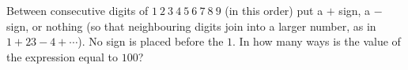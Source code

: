 Between consecutive digits of $1\ 2\ 3\ 4\ 5\ 6\ 7\ 8\ 9$ (in this order) put a $+$ sign, a $-$ sign, or nothing (so that neighbouring digits join into a larger number, as in $1+23-4+\cdots$). No sign is placed before the $1$. In how many ways is the value of the expression equal to $100$?
